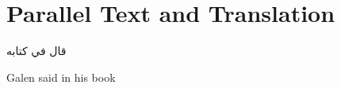 \documentclass[../main.tex]{subfiles}
\begin{document}
\chapter{Parallel Text and Translation}\label{chap:parallel}

\begin{pairs}
\begin{Leftside}
\beginnumbering
\pstart
\textarabic{قال  في كتابه}
\pend
\endnumbering
\end{Leftside}
\begin{Rightside}
\beginnumbering
\pstart
Galen said in his book
\pend
\endnumbering
\end{Rightside}
\end{pairs}
\Columns
\end{document}
